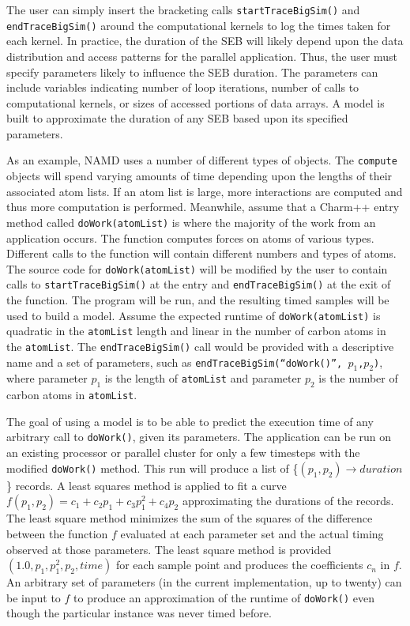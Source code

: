 The user can simply insert the bracketing calls  \texttt{startTraceBigSim()} and
  \texttt{endTraceBigSim()} around the computational kernels to log the times taken for each kernel.
In practice, the duration of the SEB will likely depend upon the data distribution and access patterns
for the parallel application. Thus, the user must specify parameters likely to influence the SEB duration.
The parameters can include variables indicating number of loop iterations, number of calls to
computational kernels, or sizes of accessed portions of data arrays. A model is built to
approximate the duration of any SEB based upon its specified parameters.

As an example, NAMD uses a number of different types of objects. The \texttt{compute} objects will spend varying amounts of time depending upon the lengths of their associated atom lists. If an atom list is large, more interactions are computed and thus more computation is performed. 
Meanwhile, assume that a Charm++ entry method called \texttt{doWork(atomList)} is where the majority
of the work from an application occurs. The function computes forces on atoms of various types.
Different calls to the function will contain different numbers and types of atoms.
The source code for  \texttt{doWork(atomList)} will be modified by the user to  contain calls to
\texttt{startTraceBigSim()} at the entry and  \texttt{endTraceBigSim()} at the exit of the function.
The program will be run, and the resulting timed samples will be used to build a model. Assume the expected runtime of \texttt{doWork(atomList)} is quadratic in the \texttt{atomList} length and linear in the number of carbon atoms in the \texttt{atomList}. The \texttt{endTraceBigSim()}  call would be provided with a descriptive name and a set of parameters, such as \texttt{endTraceBigSim(``doWork()'', $p_1$,$p_2$)},  where parameter $p_1$ is the length of \texttt{atomList} and parameter $p_2$ is the number of carbon atoms in \texttt{atomList}.

The goal of using a model is to be able to predict the execution time of any arbitrary call to
\texttt{doWork()}, given its parameters. The application can be run on an existing processor
or parallel cluster for only a few timesteps with the modified \texttt{doWork()} method. 
This run will produce a list of \{$\left(p_1,p_2\right)\rightarrow duration$\} records. 
A least squares method is applied to fit a curve $f(p_1,p_2)=c_1+c_2 p_1+c_3 p_1^2 + c_4 p_2$  
approximating the durations of the records. The least square method minimizes the sum of the
squares of the difference between the function $f$ evaluated at each parameter set and the actual
timing observed at those parameters. The least square method is provided
 $\left(1.0,p_1,p_1^2,p_2,time\right)$ for each sample point and produces the coefficients $c_n$ in $f$. 
An arbitrary set of parameters (in the current implementation, up to twenty) can be input
to $f$ to produce an approximation of the runtime of \texttt{doWork()} even though the particular instance was never timed before. 

